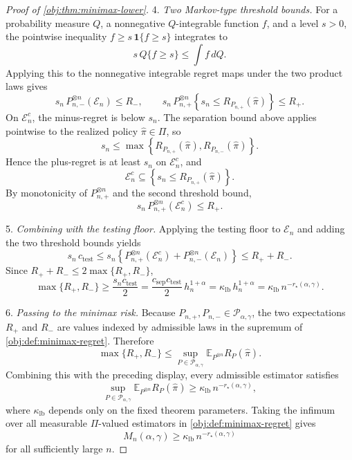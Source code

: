 \begin{proof}[Proof of \cref{obj:thm:minimax-lower}]
4. \emph{Two Markov-type threshold bounds.}  For a probability measure \(Q\), a nonnegative \(Q\)-integrable function \(f\), and a level \(s>0\), the pointwise inequality \(f\ge s\,\mathbf 1\{f\ge s\}\) integrates to
\[
s\,Q\{f\ge s\}\le\int f\,dQ .
\]
Applying this to the nonnegative integrable regret maps under the two product laws gives
\[
s_n\,P_{n,-}^{\otimes n}(\mathcal E_n)\le R_-,
\qquad
s_n\,P_{n,+}^{\otimes n}\left\{s_n\le R_{P_{n,+}}(\widehat\pi)\right\}\le R_+ .
\]
On \(\mathcal E_n^c\), the minus-regret is below \(s_n\).  The separation bound above applies pointwise to the realized policy \(\widehat\pi\in\Pi\), so
\[
s_n\le
\max\left\{R_{P_{n,+}}(\widehat\pi),R_{P_{n,-}}(\widehat\pi)\right\}.
\]
Hence the plus-regret is at least \(s_n\) on \(\mathcal E_n^c\), and
\[
\mathcal E_n^c\subseteq \left\{s_n\le R_{P_{n,+}}(\widehat\pi)\right\}.
\]
By monotonicity of \(P_{n,+}^{\otimes n}\) and the second threshold bound,
\[
s_n\,P_{n,+}^{\otimes n}(\mathcal E_n^c)\le R_+ .
\]

5. \emph{Combining with the testing floor.}  Applying the testing floor to \(\mathcal E_n\) and adding the two threshold bounds yields
\[
s_n\,c_{\mathrm{test}}
\le
s_n\left\{P_{n,+}^{\otimes n}(\mathcal E_n^c)+P_{n,-}^{\otimes n}(\mathcal E_n)\right\}
\le
R_+ + R_- .
\]
Since \(R_++R_-\le 2\max\{R_+,R_-\}\),
\[
\max\{R_+,R_-\}
\ge
\frac{s_n c_{\mathrm{test}}}{2}
=
\frac{c_{\mathrm{sep}}c_{\mathrm{test}}}{2}\,h_n^{1+\alpha}
=
\kappa_{\mathrm{lb}}\,h_n^{1+\alpha}
=
\kappa_{\mathrm{lb}}\,n^{-r_\star(\alpha,\gamma)} .
\]

6. \emph{Passing to the minimax risk.}  Because \(P_{n,+},P_{n,-}\in\mathcal P_{\alpha,\gamma}\), the two expectations \(R_+\) and \(R_-\) are values indexed by admissible laws in the supremum of \cref{obj:def:minimax-regret}.  Therefore
\[
\max\{R_+,R_-\}
\le
\sup_{P\in\mathcal P_{\alpha,\gamma}}
\mathbb E_{P^{\otimes n}} R_P(\widehat\pi).
\]
Combining this with the preceding display, every admissible estimator satisfies
\[
\sup_{P\in\mathcal P_{\alpha,\gamma}}
\mathbb E_{P^{\otimes n}} R_P(\widehat\pi)
\ge
\kappa_{\mathrm{lb}}\,n^{-r_\star(\alpha,\gamma)},
\]
where \(\kappa_{\mathrm{lb}}\) depends only on the fixed theorem parameters.  Taking the infimum over all measurable \(\Pi\)-valued estimators in \cref{obj:def:minimax-regret} gives
\[
M_n(\alpha,\gamma)\ge \kappa_{\mathrm{lb}}\,n^{-r_\star(\alpha,\gamma)}
\]
for all sufficiently large \(n\). %
\end{proof}


